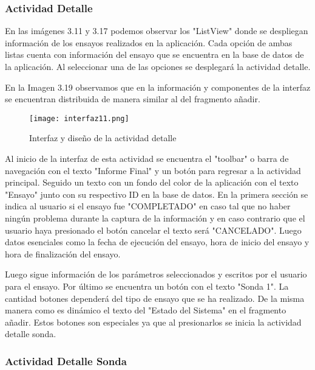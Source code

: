 \subsubsection{Actividad Detalle}

\par 
En las imágenes 3.11 y 3.17 podemos observar los "ListView" donde se despliegan información de los ensayos realizados en la aplicación. Cada opción de ambas listas cuenta con información del ensayo que se encuentra en la base de datos de la aplicación. Al seleccionar una de las opciones se desplegará la actividad detalle. 

\par \noindent
En la Imagen 3.19 observamos que en la información y componentes de la interfaz se encuentran distribuida de manera similar al del fragmento añadir.

\begin{figure}[H]
	\centering
	\texttt{[image: interfaz11.png]}
	\caption{Interfaz y diseño de la actividad detalle}
\end{figure}

\par \noindent
Al inicio de la interfaz de esta actividad se encuentra el "toolbar" o barra de navegación con el texto "Informe Final" y un botón para regresar a la actividad principal. Seguido un texto con un fondo del color de la aplicación con el texto "Ensayo" junto con su respectivo ID en la base de datos. En la primera sección se indica al usuario si el ensayo fue "COMPLETADO" en caso tal que no haber ningún problema durante la captura de la información y en caso contrario que el usuario haya presionado el botón cancelar el texto será "CANCELADO". Luego datos esenciales como la fecha de ejecución del ensayo, hora de inicio del ensayo y hora de finalización del ensayo.

\par \noindent
Luego sigue información de los parámetros seleccionados y escritos por el usuario para el ensayo. Por último se encuentra un botón con el texto "Sonda 1". La cantidad botones dependerá del tipo de ensayo que se ha realizado. De la misma manera como es dinámico el texto del "Estado del Sistema" en el fragmento añadir. Estos botones son especiales ya que al presionarlos se inicia la actividad detalle sonda.

\subsubsection{Actividad Detalle Sonda}

